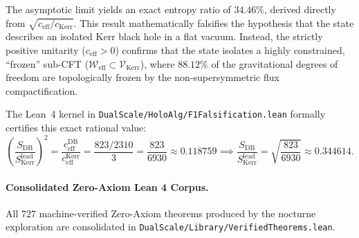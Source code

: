 \documentclass[11pt,a4paper]{article}
\theoremstyle{plain}
\theoremstyle{definition}
\theoremstyle{remark}
\begin{document}
The asymptotic limit yields an exact entropy ratio of $34.46\%$, derived directly from $\sqrt{c_{\mathrm{eff}} / c_{\mathrm{Kerr}}}$. This result mathematically falsifies the hypothesis that the state describes an isolated Kerr black hole in a flat vacuum. Instead, the strictly positive unitarity ($c_{\mathrm{eff}} > 0$) confirms that the state isolates a highly constrained, ``frozen'' sub-CFT ($\mathcal{W}_{\mathrm{eff}} \subset \mathcal{V}_{\mathrm{Kerr}}$), where $88.12\%$ of the gravitational degrees of freedom are topologically frozen by the non-supersymmetric flux compactification.

The Lean~4 kernel in \texttt{DualScale/HoloAlg/F1Falsification.lean} formally certifies this exact rational value:
\begin{equation}
  \left(\frac{S_{\mathrm{DB}}}{S_{\mathrm{Kerr}}^{\mathrm{lead}}}\right)^2 = \frac{c_{\mathrm{eff}}^{\mathrm{DB}}}{c_{\mathrm{eff}}^{\mathrm{Kerr}}} = \frac{823 / 2310}{3} = \frac{823}{6930} \approx 0.118759 \implies \frac{S_{\mathrm{DB}}}{S_{\mathrm{Kerr}}^{\mathrm{lead}}} = \sqrt{\frac{823}{6930}} \approx 0.344614.
\end{equation}

\paragraph{Consolidated Zero-Axiom Lean 4 Corpus.}
All 727 machine-verified Zero-Axiom theorems produced by the nocturne exploration are consolidated in \texttt{DualScale/Library/VerifiedTheorems.lean}.
\end{document}
